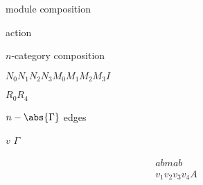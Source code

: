 \documentclass{amsart}
\begin{document}
\thispagestyle{empty}

module composition

action

$n$-category composition

\newcommand{\cN}{\mathcal{N}}
$N_0 N_1 N_2 N_3 M_0 M_1 M_2 M_3 I$

$R_0 R_4$

$n-\abs{\Gamma}$ edges

$v$
$\Gamma$

\begin{align*}
abmab & \\
v_1 v_2 v_3 v_4 A
\end{align*}
\end{document}
